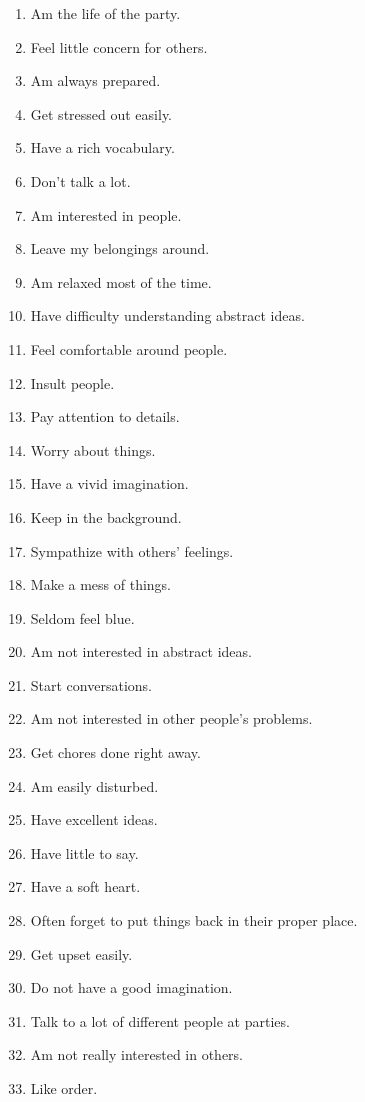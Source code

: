 \begin{enumerate}
    \item Am the life of the party.
    \item Feel little concern for others.
    \item Am always prepared.
    \item Get stressed out easily.
    \item Have a rich vocabulary.
    \item Don't talk a lot.
    \item Am interested in people.
    \item Leave my belongings around.
    \item Am relaxed most of the time.
    \item Have difficulty understanding abstract ideas.
    \item Feel comfortable around people.
    \item Insult people.
    \item Pay attention to details.
    \item Worry about things.
    \item Have a vivid imagination.
    \item Keep in the background.
    \item Sympathize with others' feelings.
    \item Make a mess of things.
    \item Seldom feel blue.
    \item Am not interested in abstract ideas.
    \item Start conversations.
    \item Am not interested in other people's problems.
    \item Get chores done right away.
    \item Am easily disturbed.
    \item Have excellent ideas.
    \item Have little to say.
    \item Have a soft heart.
    \item Often forget to put things back in their proper place.
    \item Get upset easily.
    \item Do not have a good imagination.
    \item Talk to a lot of different people at parties.
    \item Am not really interested in others.
    \item Like order.

\end{enumerate}
